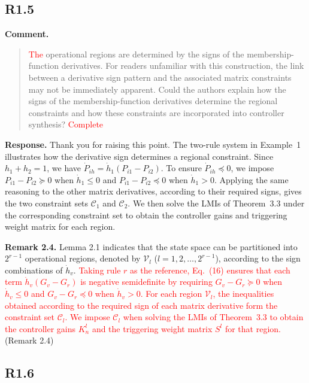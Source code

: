 \documentclass[12pt,a4paper]{article}
\begin{document}
\subsection*{R1.5}

\textbf{Comment.}
\begin{quote}
\raggedright
\textcolor{red}{The} operational regions are determined by the signs of the membership-function derivatives. For readers unfamiliar with this construction, the link between a derivative sign pattern and the associated matrix constraints may not be immediately apparent. Could the authors explain how the signs of the membership-function derivatives determine the regional constraints and how these constraints are incorporated into controller synthesis? \textcolor{red}{Complete}
\end{quote}

\textbf{Response.}
\begingroup
\setlength{\parskip}{6pt}
\noindent Thank you for raising this point. The two-rule system in Example~1 illustrates how the derivative sign determines a regional constraint. Since $h_1+h_2=1$, we have $\dot P_{ih}=\dot h_1(P_{i1}-P_{i2})$. To ensure $\dot P_{ih}\preceq 0$, we impose $P_{i1}-P_{i2}\succeq 0$ when $\dot h_1\leq 0$ and $P_{i1}-P_{i2}\preceq 0$ when $\dot h_1>0$. Applying the same reasoning to the other matrix derivatives, according to their required signs, gives the two constraint sets $\mathcal C_1$ and $\mathcal C_2$. We then solve the LMIs of Theorem~3.3 under the corresponding constraint set to obtain the controller gains and triggering weight matrix for each region.\par
\noindent \textbf{Remark 2.4.} Lemma 2.1 indicates that the state space can be partitioned into $2^{r-1}$ operational regions, denoted by $\mathcal{V}_l$ ($l = 1,2,\dots,2^{r-1}$), according to the sign combinations of $\dot{h}_v$. \textcolor{red}{Taking rule $r$ as the reference, Eq.~(16) ensures that each term $\dot h_v(G_v-G_r)$ is negative semidefinite by requiring $G_v-G_r\succeq 0$ when $\dot h_v\leq 0$ and $G_v-G_r\preceq 0$ when $\dot h_v>0$. For each region $\mathcal V_l$, the inequalities obtained according to the required sign of each matrix derivative form the constraint set $\mathcal C_l$. We impose $\mathcal C_l$ when solving the LMIs of Theorem~3.3 to obtain the controller gains $K_n^l$ and the triggering weight matrix $S^l$ for that region.} (Remark 2.4)\par
\endgroup

\subsection*{R1.6}
\end{document}
